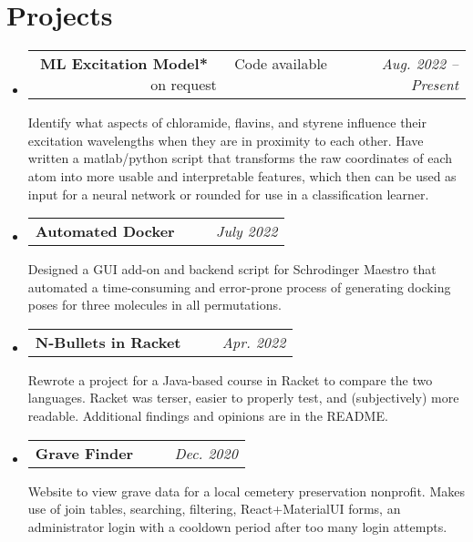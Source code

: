 \documentclass[letterpaper,11pt]{article}
\makeatletter
\newcommand{\resumeSubheading}[5]{
  \vspace{-1pt}\item
    \begin{tabular*}{0.97\textwidth}[t]{c@{\extracolsep{\fill}} r }
      \small\textbf{#1} \headingcap{#3} \ \ \ #2 &  \raggedleft\textit{\small #4} 
    \end{tabular*}
    \small#5
}
\newcommand{\resumeSubHeadingListStart}{\begin{itemize}[leftmargin=*]}
\newcommand{\resumeSubHeadingListEnd}{\end{itemize}}
\makeatother
\begin{document}
  \section{Projects\small{}}
  \resumeSubHeadingListStart
  \resumeSubheading{ML Excitation Model*}{Code available on request}{Python, Maestro, MATLAB, Bash}{Aug. 2022 -- Present}{Identify what aspects of chloramide, flavins, and styrene influence their excitation wavelengths when they are in proximity to each other. Have written a matlab/python script that transforms the raw coordinates of each atom into more usable and interpretable features, which then can be used as input for a neural network or rounded for use in a classification learner. }
  \resumeSubheading{Automated Docker}{\ghlink{automated\_docking\_script}}{Python, Maestro, Slurm}{July 2022}{Designed a GUI add-on and backend script for Schrodinger Maestro that automated a time-consuming and error-prone process of generating docking poses for three molecules in all permutations.}
  \resumeSubheading{N-Bullets in Racket}{\ghlink{nbulletsrkt}}{Racket}{Apr. 2022}
  {Rewrote a project for a Java-based course in Racket to compare the two languages. Racket was terser, easier to properly test, and (subjectively) more readable. Additional findings and opinions are in the README.}
  \resumeSubheading{Grave Finder}{\ghlink{findagravemiddleborough.ml}}{ReactJS, PHP, MySQL, Cloudflare, cPanel, SSL}{Dec. 2020}{Website to view grave data for a local cemetery preservation nonprofit. Makes use of join tables, searching, filtering, React+MaterialUI forms, an administrator login with a cooldown period after too many login attempts. }
  \resumeSubHeadingListEnd
\end{document}
